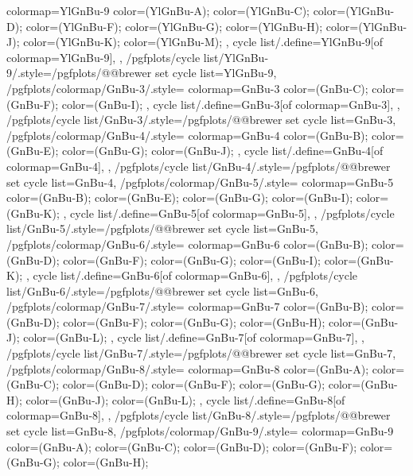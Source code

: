 {{    colormap={YlGnBu-9}{
      color=(YlGnBu-A);
      color=(YlGnBu-C);
      color=(YlGnBu-D);
      color=(YlGnBu-F);
      color=(YlGnBu-G);
      color=(YlGnBu-H);
      color=(YlGnBu-J);
      color=(YlGnBu-K);
      color=(YlGnBu-M);
    },
    cycle list/.define={YlGnBu-9}{[of colormap=YlGnBu-9]},
  },
  /pgfplots/cycle list/YlGnBu-9/.style={/pgfplots/@@brewer set cycle list={YlGnBu-9}},
  /pgfplots/colormap/GnBu-3/.style={
    colormap={GnBu-3}{
      color=(GnBu-C);
      color=(GnBu-F);
      color=(GnBu-I);
    },
    cycle list/.define={GnBu-3}{[of colormap=GnBu-3]},
  },
  /pgfplots/cycle list/GnBu-3/.style={/pgfplots/@@brewer set cycle list={GnBu-3}},
  /pgfplots/colormap/GnBu-4/.style={
    colormap={GnBu-4}{
      color=(GnBu-B);
      color=(GnBu-E);
      color=(GnBu-G);
      color=(GnBu-J);
    },
    cycle list/.define={GnBu-4}{[of colormap=GnBu-4]},
  },
  /pgfplots/cycle list/GnBu-4/.style={/pgfplots/@@brewer set cycle list={GnBu-4}},
  /pgfplots/colormap/GnBu-5/.style={
    colormap={GnBu-5}{
      color=(GnBu-B);
      color=(GnBu-E);
      color=(GnBu-G);
      color=(GnBu-I);
      color=(GnBu-K);
    },
    cycle list/.define={GnBu-5}{[of colormap=GnBu-5]},
  },
  /pgfplots/cycle list/GnBu-5/.style={/pgfplots/@@brewer set cycle list={GnBu-5}},
  /pgfplots/colormap/GnBu-6/.style={
    colormap={GnBu-6}{
      color=(GnBu-B);
      color=(GnBu-D);
      color=(GnBu-F);
      color=(GnBu-G);
      color=(GnBu-I);
      color=(GnBu-K);
    },
    cycle list/.define={GnBu-6}{[of colormap=GnBu-6]},
  },
  /pgfplots/cycle list/GnBu-6/.style={/pgfplots/@@brewer set cycle list={GnBu-6}},
  /pgfplots/colormap/GnBu-7/.style={
    colormap={GnBu-7}{
      color=(GnBu-B);
      color=(GnBu-D);
      color=(GnBu-F);
      color=(GnBu-G);
      color=(GnBu-H);
      color=(GnBu-J);
      color=(GnBu-L);
    },
    cycle list/.define={GnBu-7}{[of colormap=GnBu-7]},
  },
  /pgfplots/cycle list/GnBu-7/.style={/pgfplots/@@brewer set cycle list={GnBu-7}},
  /pgfplots/colormap/GnBu-8/.style={
    colormap={GnBu-8}{
      color=(GnBu-A);
      color=(GnBu-C);
      color=(GnBu-D);
      color=(GnBu-F);
      color=(GnBu-G);
      color=(GnBu-H);
      color=(GnBu-J);
      color=(GnBu-L);
    },
    cycle list/.define={GnBu-8}{[of colormap=GnBu-8]},
  },
  /pgfplots/cycle list/GnBu-8/.style={/pgfplots/@@brewer set cycle list={GnBu-8}},
  /pgfplots/colormap/GnBu-9/.style={
    colormap={GnBu-9}{
      color=(GnBu-A);
      color=(GnBu-C);
      color=(GnBu-D);
      color=(GnBu-F);
      color=(GnBu-G);
      color=(GnBu-H);
}}}
